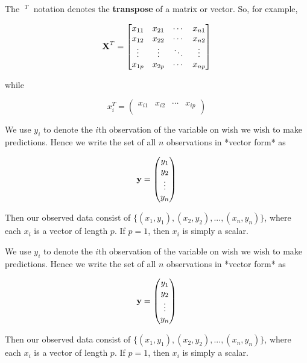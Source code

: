 \documentclass[11pt]{article}
\begin{document}
The $\;^T\;$ notation denotes the \textbf{transpose} of a matrix or vector. So, for example,

$$\textbf X^T = \begin{bmatrix} x_{11}&x_{21}&\cdots&x_{n1}\\ x_{12}&x_{22}&\cdots&x_{n2}\\ 
\vdots&\vdots&\ddots&\vdots\\ x_{1p}&x_{2p}&\cdots&x_{np}\\ \end{bmatrix}$$\newline

\centering while  

$$x_i^T = \begin{pmatrix} x_{i1}&x_{i2}&\cdots&x_{ip}\\ \end{pmatrix}$$

We use $y_i$ to denote the $i$th observation of the variable on wish we wish to make predictions. Hence we write the set of all $n$ observations in *vector form* as  

$$\textbf y = \begin{pmatrix} y_1\\ y_2 \\ \vdots\\ y_n\\ \end{pmatrix}$$

Then our observed data consist of $\{(x_1,y_1), (x_2,y_2),...,(x_n,y_n)\}$, where each $x_i$ is a vector of length $p$.
If $p=1$, then $x_i$ is simply a scalar.

We use $y_i$ to denote the $i$th observation of the variable on wish we wish to make predictions. Hence we write the set of all $n$ observations in *vector form* as  

$$\textbf y = \begin{pmatrix} y_1\\ y_2 \\ \vdots\\ y_n\\ \end{pmatrix}$$

Then our observed data consist of $\{(x_1,y_1), (x_2,y_2),...,(x_n,y_n)\}$, where each $x_i$ is a vector of length $p$.
If $p=1$, then $x_i$ is simply a scalar.\newline 
\end{document}
